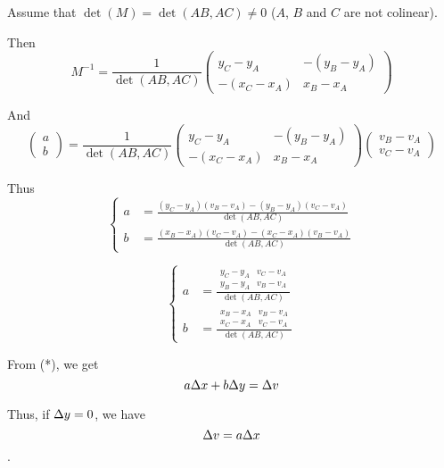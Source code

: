 Assume that $\det(M) = \det(AB,AC) \neq 0$ (\ie $A$, $B$ and $C$ are
not colinear).

Then 
\begin{displaymath}
  M^{-1} =
  \frac{1}{\det(AB,AC)}
  \left(
    \begin{array}{cc}
      y_C - y_A & - (y_B - y_A) \\
      - (x_C - x_A) & x_B - x_A
    \end{array}
  \right)
\end{displaymath}
  
And
\begin{displaymath}
  \left(
    \begin{array}{c}
      a \\
      b 
    \end{array}
  \right)
  =
  \frac{1}{\det(AB,AC)}
  \left(
    \begin{array}{cc}
      y_C - y_A & - (y_B - y_A) \\
      - (x_C - x_A) & x_B - x_A
    \end{array}
  \right)
  \left(
    \begin{array}{c}
      v_B - v_A \\
      v_C - v_A
    \end{array}
  \right)
\end{displaymath}

Thus
\begin{displaymath}
  \left\{
    \begin{aligned}
      a & = \frac{(y_C - y_A)(v_B - v_A) - (y_B - y_A)(v_C - v_A)}{\det(AB,AC)} \\
      b & = \frac{(x_B - x_A)(v_C - v_A) - (x_C - x_A)(v_B - v_A)}{\det(AB,AC)}
    \end{aligned}
  \right.
\end{displaymath}

\ie
\begin{displaymath}
  \left\{
    \begin{aligned}
      a & = \frac{\begin{array}{|cc|}
          y_C - y_A & v_C - v_A \\
          y_B - y_A & v_B - v_A
        \end{array}}{\det(AB,AC)} \\
      b & = \frac{\begin{array}{|cc|}
          x_B - x_A & v_B - v_A \\
          x_C - x_A & v_C - v_A 
        \end{array}}{\det(AB,AC)}
    \end{aligned}
  \right.
\end{displaymath}

From (*), we get
$$a \Delta x + b \Delta y = \Delta v$$

Thus, if $\Delta y = 0$, we have $$\Delta v = a \Delta x$$.
